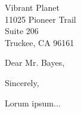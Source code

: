 

	{Vibrant Planet
	\\11025 Pioneer Trail
    \\Suite 206
	\\Truckee, CA 96161}

\date{February 17, 2024}
\opening{Dear Mr. Bayes,}
\closing{Sincerely,}
\makelettertitle

Lorum ipsum...

\makeletterclosing


